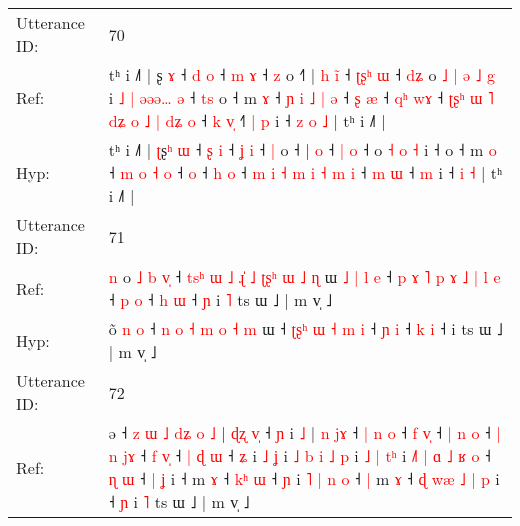 \documentclass[10pt]{article}
\DeclareRobustCommand{\hl}[1]{{\textcolor{red}{#1}}}
\begin{document}
\begin{longtable}{ll}
\midrule
Utterance ID: & 70 \\
Ref: & tʰ i ˩˥ | \hl{}ʂ\hl{} \hl{ɤ} ˧ \hl{d} \hl{o} ˧ \hl{m} \hl{ɤ} ˧ \hl{z} o ˧\hl{˥} |\hl{ }\hl{h} \hl{i}\hl{̃} ˧ \hl{ʈ}\hl{ʂ}\hl{ʰ} \hl{ɯ} ˧\hl{ }\hl{d}\hl{ʑ} o\hl{ }\hl{˩}\hl{ }\hl{|} \hl{ə} \hl{˩} \hl{g} i\hl{ }\hl{˩}\hl{ }\hl{|}\hl{ }\hl{ə}\hl{ə}\hl{ə}\hl{…}\hl{ }\hl{ə} ˧\hl{ }\hl{t}\hl{s} o ˧ m \hl{ɤ} ˧\hl{ }\hl{ɲ} \hl{i} \hl{˩} \hl{|} \hl{ə} ˧\hl{ }\hl{ʂ} \hl{æ} ˧ \hl{q}\hl{ʰ} \hl{w}\hl{ɤ} ˧\hl{ }\hl{ʈ}\hl{ʂ}\hl{ʰ} \hl{ɯ} \hl{˥} \hl{d}\hl{ʑ} \hl{o} \hl{˩} \hl{|} \hl{d}\hl{ʑ} \hl{o} ˧ \hl{k} \hl{v}\hl{̩} ˧\hl{˥}\hl{ }\hl{|} \hl{p} i ˧\hl{ }\hl{z} \hl{o} \hl{˩} | tʰ i ˩˥ |
 \\
Hyp: & tʰ i ˩˥ | \hl{ʈ}ʂ\hl{ʰ} \hl{ɯ} ˧ \hl{ʂ} \hl{i} ˧ \hl{ʝ} \hl{i} ˧ \hl{|} o ˧\hl{} |\hl{}\hl{} \hl{}\hl{o} ˧ \hl{}\hl{}\hl{|} \hl{o} ˧\hl{}\hl{}\hl{} o\hl{}\hl{}\hl{}\hl{} \hl{˧} \hl{o} \hl{˧} i\hl{}\hl{}\hl{}\hl{}\hl{}\hl{}\hl{}\hl{}\hl{}\hl{}\hl{} ˧\hl{}\hl{}\hl{} o ˧ m \hl{o} ˧\hl{}\hl{} \hl{m} \hl{o} \hl{˧} \hl{o} ˧\hl{}\hl{} \hl{o} ˧ \hl{}\hl{h} \hl{}\hl{o} ˧\hl{}\hl{}\hl{}\hl{} \hl{m} \hl{i} \hl{}\hl{˧} \hl{m} \hl{i} \hl{˧} \hl{}\hl{m} \hl{i} ˧ \hl{m} \hl{}\hl{ɯ} ˧\hl{}\hl{}\hl{} \hl{m} i ˧\hl{}\hl{} \hl{i} \hl{˧} | tʰ i ˩˥ |
 \\
\midrule
Utterance ID: & 71 \\
Ref: & \hl{n}\hl{ }o\hl{ }\hl{˩} \hl{b} \hl{v}\hl{̩} ˧\hl{ }\hl{t}\hl{s}\hl{ʰ}\hl{ }\hl{ɯ} \hl{˩} \hl{ɻ}\hl{̍} \hl{˩} \hl{ʈ}\hl{ʂ}\hl{ʰ} \hl{ɯ} \hl{˩} \hl{ɳ} ɯ\hl{ }\hl{˩}\hl{ }\hl{|}\hl{ }\hl{l}\hl{ }\hl{e} ˧\hl{ }\hl{p}\hl{ }\hl{ɤ}\hl{ }\hl{˥} \hl{p}\hl{ }\hl{ɤ} \hl{˩} \hl{|} \hl{l} \hl{e} ˧ \hl{p} \hl{o} ˧ \hl{h} \hl{ɯ} ˧\hl{ }\hl{ɲ} i\hl{ }\hl{˥} ts ɯ ˩ | m v̩ ˩
 \\
Hyp: & \hl{}\hl{}o\hl{}\hl{̃} \hl{n} \hl{}\hl{o} ˧\hl{}\hl{}\hl{}\hl{}\hl{}\hl{} \hl{n} \hl{}\hl{o} \hl{˧} \hl{}\hl{}\hl{m} \hl{o} \hl{˧} \hl{m} ɯ\hl{}\hl{}\hl{}\hl{}\hl{}\hl{}\hl{}\hl{} ˧\hl{}\hl{}\hl{}\hl{}\hl{}\hl{} \hl{ʈ}\hl{ʂ}\hl{ʰ} \hl{ɯ} \hl{˧} \hl{m} \hl{i} ˧ \hl{ɲ} \hl{i} ˧ \hl{k} \hl{i} ˧\hl{}\hl{} i\hl{}\hl{} ts ɯ ˩ | m v̩ ˩
 \\
\midrule
Utterance ID: & 72 \\
Ref: & ə ˧\hl{ }\hl{z}\hl{ }\hl{ɯ}\hl{ }\hl{˩} \hl{d}\hl{ʑ} \hl{o} \hl{˩} | \hl{ɖ}\hl{ʐ} \hl{v}\hl{̩} ˧ \hl{ɲ} i \hl{˩} |\hl{ }\hl{n} \hl{j}\hl{ɤ} ˧\hl{ }\hl{|} \hl{n} \hl{o} ˧ \hl{f} \hl{v}\hl{̩} ˧\hl{ }\hl{|} \hl{n} \hl{o} ˧\hl{ }\hl{|} \hl{n} \hl{j}\hl{ɤ} ˧\hl{ }\hl{f} \hl{v}\hl{̩} ˧\hl{ }\hl{|} \hl{ɖ} \hl{ɯ} ˧ \hl{ʑ} i \hl{˩} \hl{ʝ} i \hl{˩} \hl{b} \hl{i} \hl{˩} \hl{p} i\hl{ }\hl{˩} \hl{|} \hl{t}\hl{ʰ} i \hl{˩}\hl{˥} \hl{|} \hl{ɑ} \hl{˩} \hl{ʁ} \hl{o} ˧ \hl{ɳ} \hl{ɯ} ˧\hl{ }\hl{|} \hl{ʝ} i ˧ m \hl{ɤ} ˧ \hl{k}\hl{ʰ} \hl{ɯ} ˧ \hl{ɲ} i\hl{ }\hl{˥} \hl{|} \hl{n} \hl{o} ˧\hl{ }\hl{|} m \hl{ɤ} ˧\hl{ }\hl{ɖ}\hl{ }\hl{w}\hl{æ} \hl{˩} \hl{|} \hl{p} i ˧\hl{ }\hl{ɲ} i \hl{˥} ts ɯ ˩ | m v̩ ˩

\end{longtable}
\end{document}
